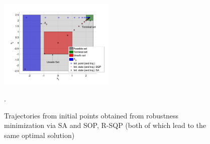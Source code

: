 \begin{figure}[t]
\centering
\includegraphics[width=0.49\textwidth]{figures/ToyExampleFalse}
\vspace{-30pt}
\caption{{\small Trajectories from initial points obtained from robustness minimization via SA and SOP, R-SQP (both of which lead to the same optimal solution)}}.
\label{fig:toy falisification}
\vspace{-20pt}
\end{figure}